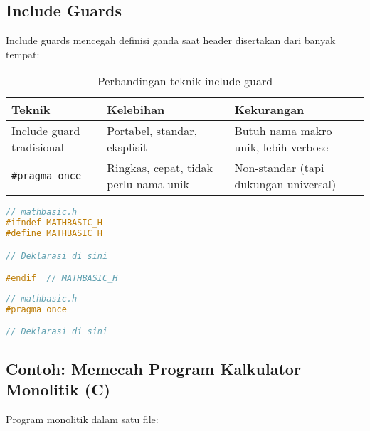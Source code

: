 \documentclass[../main.tex]{subfiles}
\begin{document}
\subsection{Include Guards}
Include guards mencegah definisi ganda saat header disertakan dari banyak tempat:

\begin{table}[H]
  \centering
  \caption{Perbandingan teknik include guard}
  \begin{tabular}{@{}p{3cm}p{5cm}p{5cm}@{}}
    \toprule
    \textbf{Teknik} & \textbf{Kelebihan} & \textbf{Kekurangan} \\
    \midrule
    Include guard tradisional & Portabel, standar, eksplisit & Butuh nama makro unik, lebih verbose \\
    \texttt{\#pragma once} & Ringkas, cepat, tidak perlu nama unik & Non-standar (tapi dukungan universal) \\
    \bottomrule
  \end{tabular}
\end{table}

\begin{lstlisting}[language=C, caption={Include guard tradisional}]
// mathbasic.h
#ifndef MATHBASIC_H
#define MATHBASIC_H

// Deklarasi di sini

#endif  // MATHBASIC_H
\end{lstlisting}

\begin{lstlisting}[language=C, caption={Pragma once (alternatif modern)}]
// mathbasic.h
#pragma once

// Deklarasi di sini
\end{lstlisting}

\subsection{Contoh: Memecah Program Kalkulator Monolitik (C)}

Program monolitik dalam satu file:
\end{document}
